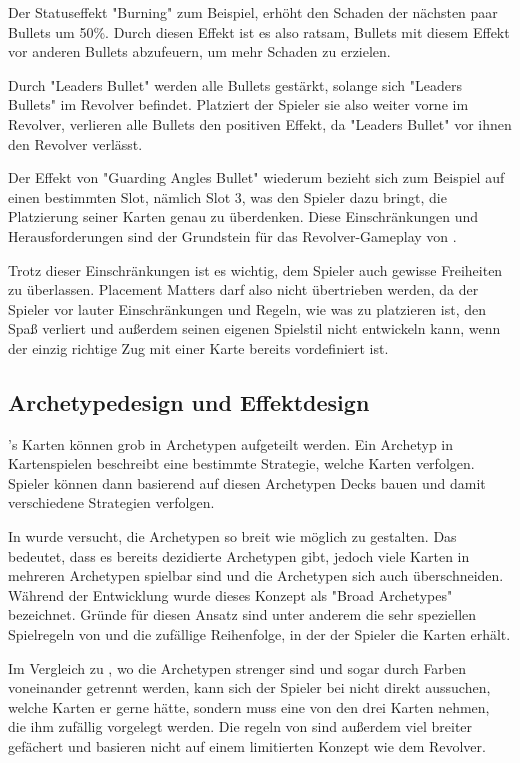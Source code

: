 Der Statuseffekt "Burning" zum Beispiel, erhöht den Schaden der nächsten paar Bullets um 50\%.
Durch diesen Effekt ist es also ratsam, Bullets mit diesem Effekt vor anderen Bullets abzufeuern, um mehr Schaden zu erzielen.


Durch "Leaders Bullet" werden alle Bullets gestärkt, solange sich "Leaders Bullets" im Revolver befindet. Platziert der Spieler sie also
weiter vorne im Revolver, verlieren alle Bullets den positiven Effekt, da "Leaders Bullet" vor ihnen den Revolver verlässt.


Der Effekt von "Guarding Angles Bullet" wiederum bezieht sich zum Beispiel auf einen bestimmten Slot, nämlich Slot 3,
was den Spieler dazu bringt, die Platzierung seiner Karten genau zu überdenken. Diese Einschränkungen und Herausforderungen
sind der Grundstein für das Revolver-Gameplay von \FF.


Trotz dieser Einschränkungen ist es wichtig, dem Spieler auch gewisse Freiheiten zu überlassen. Placement Matters darf
also nicht übertrieben werden, da der Spieler vor lauter Einschränkungen und Regeln, wie was zu platzieren ist, den Spaß
verliert und außerdem seinen eigenen Spielstil nicht entwickeln kann, wenn der einzig richtige Zug mit einer Karte bereits vordefiniert ist.



\subsection{Archetypedesign und Effektdesign}\label{subsec:placementMatters}

\FF's Karten können grob in Archetypen aufgeteilt werden. Ein Archetyp in Kartenspielen beschreibt eine bestimmte Strategie, welche Karten verfolgen.
Spieler können dann basierend auf diesen Archetypen Decks bauen und damit verschiedene Strategien verfolgen.


In \FF wurde versucht, die Archetypen so breit wie möglich zu gestalten. Das bedeutet, dass es bereits dezidierte Archetypen gibt,
jedoch viele Karten in mehreren Archetypen spielbar sind und die Archetypen sich auch überschneiden.
Während der Entwicklung wurde dieses Konzept als "Broad Archetypes" bezeichnet. Gründe für diesen Ansatz sind unter anderem
die sehr speziellen Spielregeln von \FF und die zufällige Reihenfolge, in der der Spieler die Karten erhält.


Im Vergleich zu , wo die Archetypen strenger sind und sogar durch Farben voneinander getrennt werden,
kann sich der Spieler bei \FF nicht direkt aussuchen, welche Karten er gerne hätte, sondern muss eine von den drei Karten nehmen,
die ihm zufällig vorgelegt werden. Die regeln von  sind außerdem viel breiter gefächert und basieren nicht auf einem limitierten
Konzept wie dem Revolver. 


